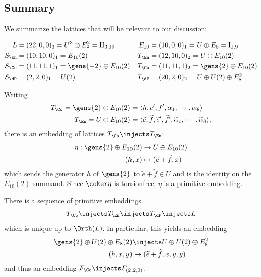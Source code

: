 \documentclass[../../main.tex]{subfiles}
\begin{document}
\subsection{Summary}
We summarize the lattices that will be relevant to our discussion:

\begin{align*}
    L &= (22, 0, 0)_3 = U^3 \oplus E_8^2 = \rm{II}_{3, 19} &
    E_{10} &= (10, 0, 0)_1 = U \oplus E_8 = \mathrm{I}_{1, 9} \\
    S_\En &= (10, 10, 0)_1 = E_{10}(2) & 
    T_\En &= (12, 10, 0)_2 = U \oplus E_{10}(2) \\
    S_\Co &= (11, 11, 1)_1 = \gens{-2} \oplus E_{10}(2) & 
    T_\Co &= (11,11,1)_2 = \gens{2} \oplus E_{10}(2) \\
    S_{\dP} &= (2,2,0)_1 = U(2) &
    T_{\dP} &= (20, 2, 0)_2 = U \oplus U(2) \oplus E_8^2
\end{align*}

\begin{lemma}\label{lem:primitive_embedding_eta}
Writing
\begin{align*}
T_\Co = \gens{2} \oplus E_{10}(2) &= \langle h, e', f',\alpha_1,\cdots, \alpha_8 \rangle \\
T_\En = U \oplus E_{10}(2) &= \langle \tilde e,\tilde f,\tilde e',\tilde f',\tilde \alpha_1,\cdots,\tilde \alpha_8\rangle,
\end{align*}
there is an embedding of lattices $T_\Co \injects T_\En$:
\begin{align*}
    \eta: \gens{2} \oplus E_{10}(2) &\to U \oplus E_{10}(2) \\
    (h, x) &\mapsto (\tilde e + \tilde f, x)
\end{align*}
which sends the generator $h$ of $\gens{2}$ to $\tilde e+\tilde f\in U$ and is the identity on the $E_{10}(2)$ summand. Since $\coker \eta$ is torsionfree, $\eta$ is a primitive embedding.
\end{lemma}

\begin{lemma}\label{lem:sequence_of_embeddings}
There is a sequence of primitive embeddings
\[
T_{\Co} \injects T_{\En} \injects T_{\dP} \injects L
\]
which is unique up to $\Orth(L)$. In particular, this yields an embedding
\begin{align*}
    \gens{2} \oplus U(2) \oplus E_8(2) &\injects U \oplus U(2) \oplus E_8^2 \\
    (h,x,y) & \mapsto (\tilde e + \tilde f, x, y, y)
\end{align*}
and thus an embedding $F_{\Co} \injects F_{(2,2,0)}$.
\end{lemma}
\end{document}
